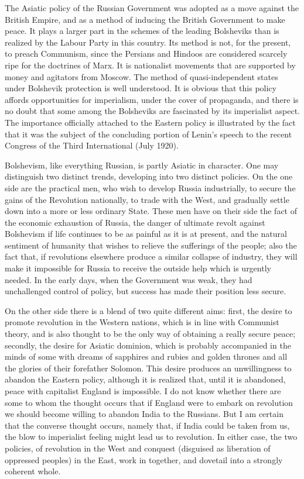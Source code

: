 The Asiatic policy of the Russian Government was adopted as a move against the British Empire, and as a method of inducing the British Government to make peace. It plays a larger part in the schemes of the leading Bolsheviks than is realized by the Labour Party in this country. Its method is not, for the present, to preach Communism, since the Persians and Hindoos are considered scarcely ripe for the doctrines of Marx. It is nationalist movements that are supported by money and agitators from Moscow. The method of quasi-independent states under Bolshevik protection is well understood. It is obvious that this policy affords opportunities for imperialism, under the cover of propaganda, and there is no doubt that some among the Bolsheviks are fascinated by its imperialist aspect. The importance officially attached to the Eastern policy is illustrated by the fact that it was the subject of the concluding portion of Lenin's speech to the recent Congress of the Third International (July 1920).

Bolshevism, like everything Russian, is partly Asiatic in character. One may distinguish two distinct trends, developing into two distinct policies. On the one side are the practical men, who wish to develop Russia industrially, to secure the gains of the Revolution nationally, to trade with the West, and gradually settle down into a more or less ordinary State. These men have on their side the fact of the economic exhaustion of Russia, the danger of ultimate revolt against Bolshevism if life continues to be as painful as it is at present, and the natural sentiment of humanity that wishes to relieve the sufferings of the people; also the fact that, if revolutions elsewhere produce a similar collapse of industry, they will make it impossible for Russia to receive the outside help which is urgently needed. In the early days, when the Government was weak, they had unchallenged control of policy, but success has made their position less secure.

On the other side there is a blend of two quite different aims: first, the desire to promote revolution in the Western nations, which is in line with Communist theory, and is also thought to be the only way of obtaining a really secure peace; secondly, the desire for Asiatic dominion, which is probably accompanied in the minds of some with dreams of sapphires and rubies and golden thrones and all the glories of their forefather Solomon. This desire produces an unwillingness to abandon the Eastern policy, although it is realized that, until it is abandoned, peace with capitalist England is impossible. I do not know whether there are some to whom the thought occurs that if England were to embark on revolution we should become willing to abandon India to the Russians. But I am certain that the converse thought occurs, namely that, if India could be taken from us, the blow to imperialist feeling might lead us to revolution. In either case, the two policies, of revolution in the West and conquest (disguised as liberation of oppressed peoples) in the East, work in together, and dovetail into a strongly coherent whole.

